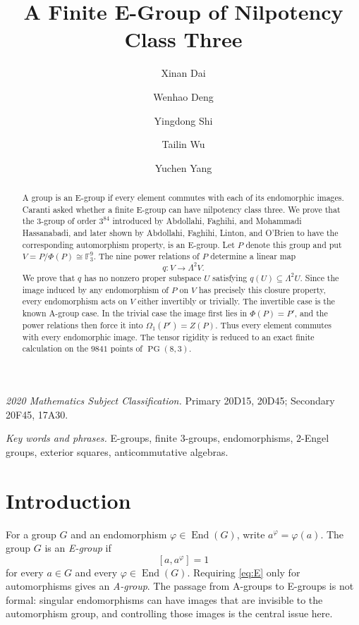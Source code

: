 \documentclass[11pt]{amsart}
\title{A Finite E-Group of Nilpotency Class Three}
\author{Xinan Dai}
\author{Wenhao Deng}
\author{Yingdong Shi}
\author{Tailin Wu}
\author{Yuchen Yang}
\date{}
\theoremstyle{definition}
\theoremstyle{remark}
\newcommand{\F}{\mathbb F}
\newcommand{\End}{\operatorname{End}}
\newcommand{\PG}{\operatorname{PG}}
\begin{document}
\begin{abstract}
A group is an E-group if every element commutes with each of its endomorphic
images.  Caranti asked whether a finite E-group can have nilpotency class
three.  We prove that the $3$-group of order $3^{84}$ introduced by
Abdollahi, Faghihi, and Mohammadi Hassanabadi, and later shown by Abdollahi,
Faghihi, Linton, and O'Brien to have the corresponding automorphism
property, is an E-group.  Let $P$ denote this group and put
$V=P/\Phi(P)\cong\F_3^9$.  The nine power relations of $P$ determine a
linear map
\[
                         q:V\longrightarrow \Lambda^2V.
\]
We prove that $q$ has no nonzero proper subspace $U$ satisfying
$q(U)\subseteq\Lambda^2U$.  Since the image induced by any endomorphism of
$P$ on $V$ has precisely this closure property, every endomorphism acts on
$V$ either invertibly or trivially.  The invertible case is the known
A-group case.  In the trivial case the image first lies in
$\Phi(P)=P'$, and the power relations then force it into
$\Omega_1(P')=Z(P)$.  Thus every element commutes with every endomorphic
image.  The tensor rigidity is reduced to an exact finite calculation on
the $9841$ points of $\PG(8,3)$.
\end{abstract}

\maketitle

\noindent\textit{2020 Mathematics Subject Classification.}
Primary 20D15, 20D45; Secondary 20F45, 17A30.

\noindent\textit{Key words and phrases.}
E-groups, finite $3$-groups, endomorphisms, $2$-Engel groups, exterior
squares, anticommutative algebras.

\section{Introduction}\label{sec:intro}

For a group $G$ and an endomorphism $\varphi\in\End(G)$, write
$a^\varphi=\varphi(a)$.  The group $G$ is an \emph{E-group} if
\begin{equation}\label{eq:E}
                            [a,a^\varphi]=1
\end{equation}
for every $a\in G$ and every $\varphi\in\End(G)$.  Requiring
\eqref{eq:E} only for automorphisms gives an \emph{A-group}.  The passage
from A-groups to E-groups is not formal: singular endomorphisms can have
images that are invisible to the automorphism group, and controlling those
images is the central issue here.
\end{document}
